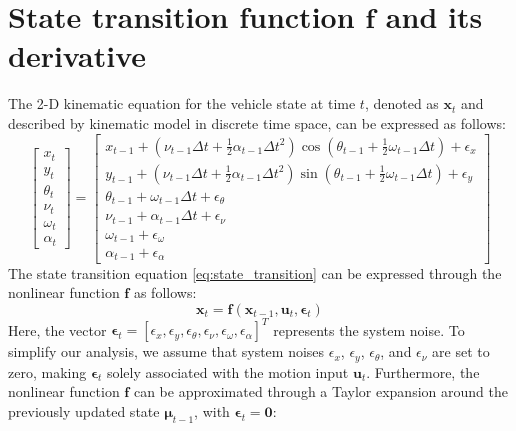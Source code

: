 \documentclass[12pt, a4paper]{article}
\begin{document}
\section{State transition function $\bm{f}$ and its derivative}
The 2-D kinematic equation for the vehicle state at time $t$, denoted as $\bm{x}_t$ and described by kinematic model in discrete time space, can be expressed as follows:
\begin{equation}
  \label{eq:state_transition}
  \begin{bmatrix}
    x_{t}\\
    y_{t}\\
    \theta_{t}\\
    \nu_{t}\\
    \omega_{t}\\
    \alpha_{t}
  \end{bmatrix}=
  \begin{bmatrix}
    x_{t-1} + (\nu_{t-1}\Delta t + \frac{1}{2}\alpha_{t-1}\Delta t^2) \cos(\theta_{t-1}+\frac{1}{2}\omega_{t-1}\Delta t) + \epsilon_{x}\\
    y_{t-1} + (\nu_{t-1}\Delta t + \frac{1}{2}\alpha_{t-1}\Delta t^2) \sin(\theta_{t-1}+\frac{1}{2}\omega_{t-1}\Delta t) + \epsilon_{y}\\
    \theta_{t-1} + \omega_{t-1}\Delta t + \epsilon_{\theta}\\
    \nu_{t-1} + \alpha_{t-1} \Delta t + \epsilon_{\nu}\\
    \omega_{t-1}+\epsilon_{\omega}\\
    \alpha_{t-1}+\epsilon_{\alpha}
  \end{bmatrix}
\end{equation}
The state transition equation \eqref{eq:state_transition} can be expressed through the nonlinear function $\bm{f}$ as follows:
\[
  \bm{x}_{t} = \bm{f}(\bm{x}_{t-1}, \bm{u}_{t},\bm{\epsilon}_{t})
\]
Here, the vector $\bm{\epsilon}_{t}=[\epsilon_{x}, \epsilon_{y}, \epsilon_{\theta}, \epsilon_{\nu}, \epsilon_{\omega}, \epsilon_{\alpha}]^{T}$ represents the system noise. To simplify our analysis, we assume that system noises $\epsilon_{x}$, $\epsilon_{y}$, $\epsilon_{\theta}$, and $\epsilon_{\nu}$ are set to zero, making $\bm{\epsilon}_{t}$ solely associated with the motion input $\bm{u}_{t}$. Furthermore, the nonlinear function $\bm{f}$ can be approximated through a Taylor expansion around the previously updated state $\bm{\mu}_{t-1}$, with $\bm{\epsilon}_{t}=\bm{0}$:
\end{document}
